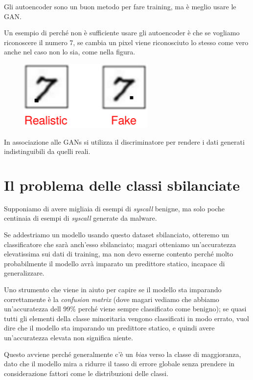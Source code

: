\documentclass{report}
\begin{document}
Gli autoencoder sono un buon metodo per fare training, ma è meglio usare le GAN.

\noindent Un esempio di perché non è sufficiente usare gli autoencoder è che se vogliamo riconoscere il numero 7, se cambia un pixel viene
riconosciuto lo stesso come vero anche nel caso non lo sia, come nella figura.

\begin{figure}[H]
    \centering
    \includegraphics[width=0.4\linewidth]{images/seven.png}
\end{figure}

\noindent In associazione alle GANs si utilizza il discriminatore per rendere i dati generati indistinguibili da quelli reali.

\section{Il problema delle classi sbilanciate}

Supponiamo di avere migliaia di esempi di \textit{syscall} benigne, ma solo poche centinaia di esempi di \textit{syscall} generate 
da malware.

\noindent Se addestriamo un modello usando questo dataset sbilanciato, otteremo un classificatore che sarà anch'esso sbilanciato; magari otteniamo
un'accuratezza elevatissima sui dati di training, ma non devo esserne contento perché molto probabilmente il modello avrà imparato un 
predittore statico, incapace di generalizzare.

\noindent Uno strumento che viene in aiuto per capire se il modello sta imparando correttamente è la \textit{confusion matrix} (dove magari vediamo 
che abbiamo un'accuratezza dell 99\% perché viene sempre classificato come benigno); se quasi tutti gli elementi della classe minoritaria 
vengono classificati in modo errato, vuol dire che il modello sta imparando un predittore statico, e quindi avere un'accuratezza elevata 
non significa niente.

\noindent Questo avviene perché generalmente c'è un \textit{bias} verso la classe di maggioranza, dato che il modello mira a ridurre il tasso di 
errore globale senza prendere in considerazione fattori come le distribuzioni delle classi.
\end{document}
